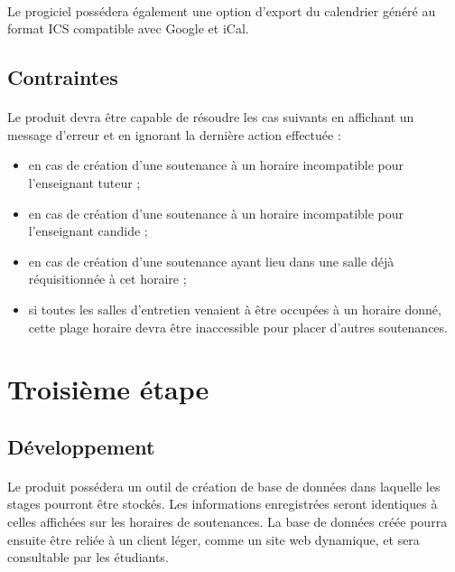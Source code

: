 \documentclass[a4paper,10pt]{report}
\begin{document}
	\paragraph{}
	Le progiciel possédera également une option d’export du calendrier généré au format ICS compatible avec Google et iCal.
	
      \subsection{Contraintes}
	\paragraph{}

	Le produit devra être capable de résoudre les cas suivants en affichant un message d’erreur et en ignorant la dernière action effectuée :
	\newline
	\renewcommand\labelitemi{\textbullet}
	\begin{itemize}
	  \item en cas de création d'une soutenance à un horaire incompatible pour l'enseignant tuteur ;
	  \item en cas de création d'une soutenance à un horaire incompatible pour l'enseignant candide ;
	  \item en cas de création d'une soutenance ayant lieu dans une salle déjà réquisitionnée à cet horaire ;
	  \item si toutes les salles d’entretien venaient à être occupées à un horaire donné, cette plage horaire devra être inaccessible pour placer d’autres soutenances.
	\end{itemize}
  
      

    \section{Troisième étape}
      \subsection{Développement}
	\paragraph{}
	Le produit possédera un outil de création de base de données dans laquelle les stages pourront être stockés. 
	Les informations enregistrées seront identiques à celles affichées sur les horaires de soutenances. 
	La base de données créée pourra ensuite être reliée à un client léger, comme un site web dynamique, et sera consultable par les étudiants.
\end{document}
